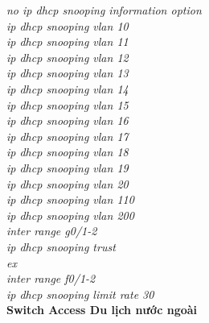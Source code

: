 \documentclass[a4paper, 12pt]{article}
\begin{document}
\hspace*{2cm}\textit{no ip dhcp snooping information option\\
\hspace*{2cm}ip dhcp snooping vlan 10\\
\hspace*{2cm}ip dhcp snooping vlan 11\\
\hspace*{2cm}ip dhcp snooping vlan 12\\
\hspace*{2cm}ip dhcp snooping vlan 13\\
\hspace*{2cm}ip dhcp snooping vlan 14\\
\hspace*{2cm}ip dhcp snooping vlan 15\\
\hspace*{2cm}ip dhcp snooping vlan 16\\
\hspace*{2cm}ip dhcp snooping vlan 17\\
\hspace*{2cm}ip dhcp snooping vlan 18\\
\hspace*{2cm}ip dhcp snooping vlan 19\\
\hspace*{2cm}ip dhcp snooping vlan 20\\
\hspace*{2cm}ip dhcp snooping vlan 110\\
\hspace*{2cm}ip dhcp snooping vlan 200\\
\hspace*{2cm}inter range g0/1-2\\
\hspace*{2cm}ip dhcp snooping trust\\
\hspace*{2cm}ex\\
\hspace*{2cm}inter range f0/1-2\\
\hspace*{2cm}ip dhcp snooping limit rate 30\\}
\hspace*{1cm}\textbf{Switch Access Du lịch nước ngoài}\\
\end{document}
